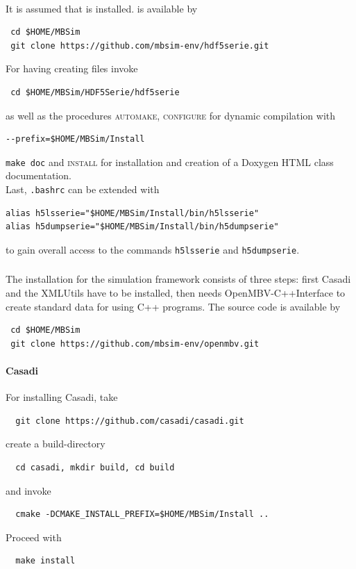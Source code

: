 \paragraph{\HDFSerie}
It is assumed that \FMatVec{} is installed. \HDFSerie is available by
\begin{verbatim}
 cd $HOME/MBSim
 git clone https://github.com/mbsim-env/hdf5serie.git
\end{verbatim}
For having \MBSim{} creating \HDF{} files invoke
\begin{verbatim}
 cd $HOME/MBSim/HDF5Serie/hdf5serie
\end{verbatim}
as well as the procedures \textsc{automake, configure} for dynamic compilation with
\begin{verbatim}
--prefix=$HOME/MBSim/Install
\end{verbatim}
\texttt{make doc} and \textsc{install} for installation and creation of a Doxygen HTML class documentation.\\
%
Last, \texttt{.bashrc} can be extended with
\begin{verbatim}
alias h5lsserie="$HOME/MBSim/Install/bin/h5lsserie"
alias h5dumpserie="$HOME/MBSim/Install/bin/h5dumpserie"
\end{verbatim}
to gain overall access to the commands \texttt{h5lsserie} and \texttt{h5dumpserie}.

\subsubsection{\OpenMBV{}}
The installation for the simulation framework consists of three steps: first Casadi and the XMLUtils have to be installed, then \MBSim{} needs \textsf{OpenMBV-C++Interface} to create standard data for \OpenMBV{} using C++ programs. The source code is available by
\begin{verbatim}
 cd $HOME/MBSim
 git clone https://github.com/mbsim-env/openmbv.git
\end{verbatim}
%
\paragraph{Casadi}
For installing Casadi, take
\begin{verbatim}
  git clone https://github.com/casadi/casadi.git
\end{verbatim}
create a build-directory
\begin{verbatim}
  cd casadi, mkdir build, cd build
\end{verbatim}
and invoke
\begin{verbatim}
  cmake -DCMAKE_INSTALL_PREFIX=$HOME/MBSim/Install ..
\end{verbatim}
Proceed with
\begin{verbatim}
  make install
\end{verbatim}
%
